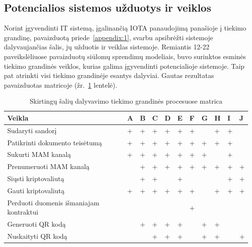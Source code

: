 
\subsection{Potencialios sistemos užduotys ir veiklos} \label{subsection:uc-system}

Norint įgyvendinti IT sistemą, įgalinančią IOTA panaudojimą panašioje į tiekimo grandinę, pavaizduotą priede~\ref{appendix:1}, svarbu apsibrėžti sistemoje dalyvaujančias šalis, jų užduotis ir veiklas sistemoje. Remiantis 12-22 paveikslėliuose pavaizduotų siūlomų sprendimų modeliais, buvo surinktos esminės tiekimo grandinės veiklos, kurias galima įgyvendinti potencialioje sistemoje. Taip pat atrinkti visi tiekimo grandinėje esantys dalyviai. Gautas rezultatas pavaizduotas matricoje (žr.~\ref{tab:2} lentelė). 

\begin{table}[h]
\centering
\caption{Skirtingų šalių dalyvavimo tiekimo grandinės procesuose matrica}
\label{tab:2}
\begin{tabular}{|l|l|l|l|l|l|l|l|l|l|l|}
\hline
\textbf{Veikla} & \multicolumn{1}{c|}{\textbf{A}} & \multicolumn{1}{c|}{\textbf{B}} & \textbf{C} & \textbf{D} & \textbf{E} & \textbf{F} & \textbf{G} & \textbf{H} & \textbf{I} & \textbf{J} \\ \hline
Sudaryti sandorį & + & + & + & + & + & + &  & + & + &  \\ \hline
Patikrinti dokumento teisėtumą & + & + & + & + & + & + & + & + & + &  \\ \hline
Sukurti MAM kanalą & + & + & + & + & + & + & + &  & + &  \\ \hline
Prenumeruoti MAM kanalą &  & + & + & + & + & + & + & + & + & + \\ \hline
Siųsti kriptovaliutą &  & + & + &  & + &  &  &  & + & + \\ \hline
Gauti kriptovaliutą & + & + & + & + & + & + &  & + & + & + \\ \hline
Perduoti duomenis išmaniajam kontraktui &  &  &  &  &  & + &  &  &  &  \\ \hline
Generuoti QR kodą &  & + & + & + & + &  & + & + &  &  \\ \hline
Nuskaityti QR kodą &  &  & + & + & + &  & + & + &  & + \\ \hline
\end{tabular}
\end{table}

